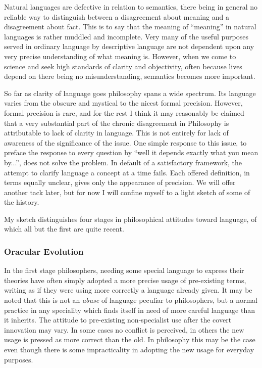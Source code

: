 Natural languages are defective in relation to semantics, there being in general no reliable way to distinguish between a disagreement about meaning and a disagreement about fact.
This is to say that the meaning of ``meaning'' in natural languages is rather muddled and incomplete.
Very many of the useful purposes served in ordinary language by descriptive language are not dependent upon any very precise understanding of what meaning is.
However, when we come to science and seek high standards of clarity and objectivity, often because lives depend on there being no misunderstanding, semantics becomes more important.

So far as clarity of language goes philosophy spans a wide spectrum.
Its language varies from the obscure and mystical to the nicest formal precision.
However, formal precision is rare, and for the rest I think it may reasonably be claimed that a very substantial part of the chronic disagreement in Philosophy is attributable to lack of clarity in language.
This is not entirely for lack of awareness of the significance of the issue.
One simple response to this issue, to preface the response to every question by ``well it depends exactly what you mean by...'', does not solve the problem.
In default of a satisfactory framework, the attempt to clarify language a concept at a time fails.
Each offered definition, in terms equally unclear, gives only the appearance of precision.
We will offer another tack later, but for now I will confine myself to a light sketch of some of the history.

My sketch distinguishes four stages in philosophical attitudes toward language, of which all but the first are quite recent.

\subsubsection{Oracular Evolution}

In the first stage philosophers, needing some special language to express their theories have often simply adopted a more precise usage of pre-existing terms, writing as if they were using more correctly a language already given.
It may be noted that this is not an {\it abuse} of language peculiar to philosophers, but a normal practice in any speciality which finds itself in need of more careful language than it inherits.
The attitude to pre-existing non-specialist use after the covert innovation may vary.
In some cases no conflict is perceived, in others the new usage is pressed as more correct than the old.
In philosophy this may be the case even though there is some impracticality in adopting the new usage for everyday purposes.

